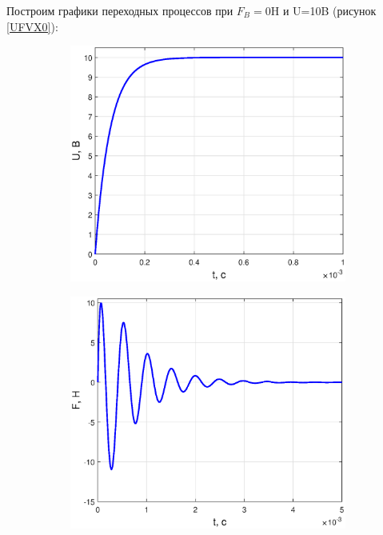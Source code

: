 \documentclass[12pt,a4paper]{article}
\begin{document}
Построим графики переходных процессов при $F_B=0$H и U=10B (рисунок \ref{UFVX0}):
\begin{figure}[H]
	\centering
	\begin{subfigure}[b]{0.48\textwidth}
	    \includegraphics[width = \textwidth]{U0}
	\end{subfigure}
	\hfill
	\begin{subfigure}[b]{0.48\textwidth}
		\includegraphics[width = \textwidth]{F0}
	\end{subfigure}

\end{figure}
\end{document}
